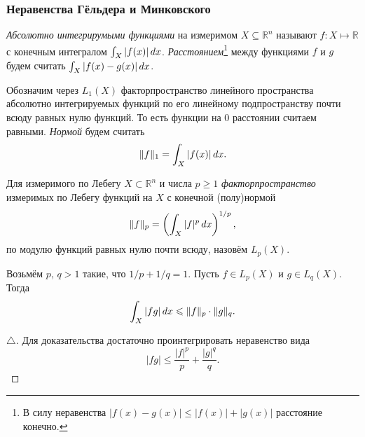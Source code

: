 \subsubsection*{Неравенства Гёльдера и Минковского}


\begin{to_def}
    \textit{Абсолютно интегрирумыми функциями} на измеримом $X \subseteq \mathbb{R}^n$ называют $f \colon X \mapsto \mathbb{R}$ с конечным интегралом $\int_X |f(x)| \, d x$. \textit{Расстоянием}\footnote{
        В силу неравенства $|f(x) - g(x)| \leq |f(x)| + |g(x)|$ расстояние конечно.
    } между функциями $f$ и $g$ будем считать $\int_X |f(x)-g(x)| \, d x$.
\end{to_def}

\begin{to_def}
    Обозначим через $L_1 (X)$ факторпространство  линейного пространства абсолютно интегрируемых функций по его линейному подпространству почти всюду равных нулю функций. То есть функции на $0$ расстоянии считаем равными. \textit{Нормой} будем считать
    \begin{equation*}
        \|f\|_1 = \int_X |f(x)| \, d x.
    \end{equation*}
\end{to_def}

\begin{to_def}
    Для измеримого по Лебегу $X \subset \mathbb{R}^n$ и числа $p \geq 1$ \textit{факторпространство} измеримых по Лебегу функций на $X$ с конечной (полу)нормой
    \begin{equation*}
        \|f\|_p
        = 
        \left(
            \int_X |f|^p \, d x
        \right)^{1/p},
    \end{equation*}
    по модулю функций равных нулю почти всюду,
    назовём $L_p (X)$.
\end{to_def}

\begin{to_thr}
    Возьмём $p, \, q > 1$ такие, что $1/p + 1/q = 1$. Пусть $f \in L_p (X)$ и $g \in L_q(X)$. Тогда
    \begin{equation*}
        \int_X |fg| \, d x \leqslant \|f\|_p \cdot \|g\|_q.
    \end{equation*}
\end{to_thr}

\begin{proof}[$\triangle$]
    Для доказательства достаточно проинтегрировать неравенство вида
    \begin{equation*}
        |fg| \leq \frac{|f|^p}{p} + \frac{|g|^q}{q}.
    \end{equation*}
\end{proof}

